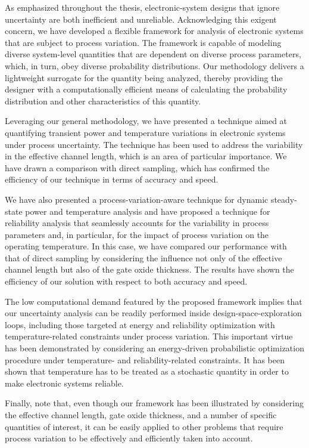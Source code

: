 As emphasized throughout the thesis, electronic-system designs that ignore
uncertainty are both inefficient and unreliable. Acknowledging this exigent
concern, we have developed a flexible framework for analysis of electronic
systems that are subject to process variation. The framework is capable of
modeling diverse system-level quantities that are dependent on diverse process
parameters, which, in turn, obey diverse probability distributions. Our
methodology delivers a lightweight surrogate for the quantity being analyzed,
thereby providing the designer with a computationally efficient means of
calculating the probability distribution and other characteristics of this
quantity.

Leveraging our general methodology, we have presented a technique aimed at
quantifying transient power and temperature variations in electronic systems
under process uncertainty. The technique has been used to address the
variability in the effective channel length, which is an area of particular
importance. We have drawn a comparison with direct sampling, which has confirmed
the efficiency of our technique in terms of accuracy and speed.

We have also presented a process-variation-aware technique for dynamic
steady-state power and temperature analysis and have proposed a technique for
reliability analysis that seamlessly accounts for the variability in process
parameters and, in particular, for the impact of process variation on the
operating temperature. In this case, we have compared our performance with that
of direct sampling by considering the influence not only of the effective
channel length but also of the gate oxide thickness. The results have shown the
efficiency of our solution with respect to both accuracy and speed.

The low computational demand featured by the proposed framework implies that our
uncertainty analysis can be readily performed inside design-space-exploration
loops, including those targeted at energy and reliability optimization with
temperature-related constraints under process variation. This important virtue
has been demonstrated by considering an energy-driven probabilistic optimization
procedure under temperature- and reliability-related constraints. It has been
shown that temperature has to be treated as a stochastic quantity in order to
make electronic systems reliable.

Finally, note that, even though our framework has been illustrated by
considering the effective channel length, gate oxide thickness, and a number of
specific quantities of interest, it can be easily applied to other problems that
require process variation to be effectively and efficiently taken into account.
